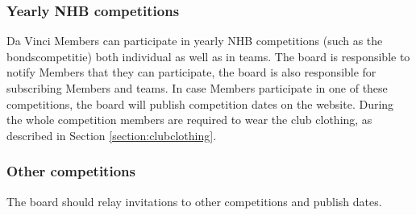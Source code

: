 \documentclass[a4paper]{article}
\begin{document}
\subsubsection{Yearly NHB competitions}
Da Vinci { Members} can participate in yearly { NHB} competitions (such as the bondscompetitie) both individual as well as in teams. The board is responsible to notify { Members} that they can participate, the board is also responsible for subscribing { Members} and teams. In case { Members} participate in one of these competitions, the board will publish competition dates on the website. During the whole competition members are required to wear the club clothing, as described in Section \ref{section:clubclothing}.

\subsubsection{Other competitions}
The board should relay invitations to other competitions and publish dates.
\end{document}
